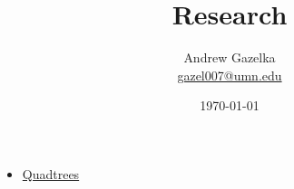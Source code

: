 \documentclass{article}
\title{Research}
\author{Andrew Gazelka\\ \url{gazel007@umn.edu}}
\date{\today}
\begin{document}
\maketitle

\begin{itemize}
    \item \href{https://en.wikipedia.org/wiki/Quadtree#:~:text=A%20quadtree%20is%20a%20tree,into%20four%20quadrants%20or%20regions.}{Quadtrees}
\end{itemize}


\end{document}
